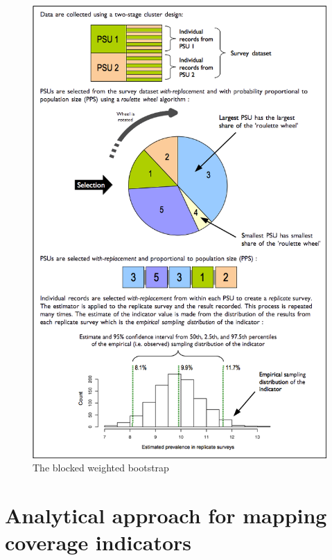 \documentclass[12pt,a4paper]{book}
\theoremstyle{definition}
\theoremstyle{definition}
\theoremstyle{definition}
\theoremstyle{remark}
\begin{document}
\begin{figure}[H]

{\centering \includegraphics[width=9.76in]{figures/bbw} 

}

\caption{The blocked weighted bootstrap}\label{fig:indicators31}
\end{figure}

\hypertarget{analytical-approach-for-mapping-coverage-indicators}{%
\section{Analytical approach for mapping coverage
indicators}\label{analytical-approach-for-mapping-coverage-indicators}}
\end{document}

